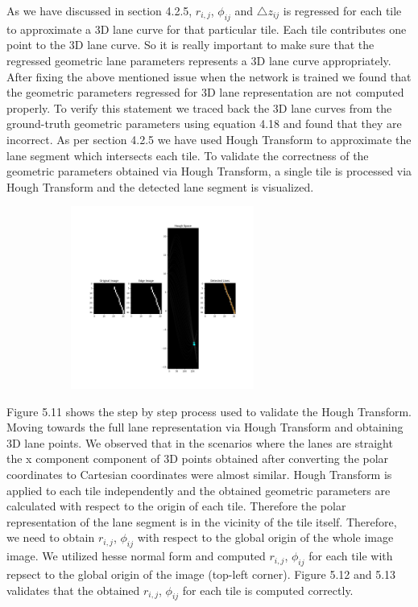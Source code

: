 As we have discussed in section 4.2.5, $r_{i,j}$, $\phi_{ij}$ and $\triangle{z}_{ij}$ is regressed for each tile to approximate a 3D lane curve for that particular tile. Each tile contributes one point to the 3D lane curve. So it is really important to make sure that the regressed geometric lane parameters represents a 3D lane curve appropriately. After fixing the above mentioned issue when the network is trained we found that the geometric parameters regressed for 3D lane representation are not computed properly. To verify this statement we traced back the 3D lane curves from the ground-truth geometric parameters using equation 4.18 and found that they are incorrect. As per section 4.2.5 we have used Hough Transform to approximate the lane segment which intersects each tile. To validate the correctness of the geometric parameters obtained via Hough Transform, a single tile is processed via Hough Transform and the detected lane segment is visualized.

        \begin{figure}[h]
       \caption{Validating Hough Transform and visualizing the detected lane segment from a single tile}
        \centering
        \begin{subfigure}{0.6\textwidth}
        \includegraphics[width=1\linewidth, height=6cm]{images/hough_validation.jpg} 
        \label{fig:subim1}
        \end{subfigure}
        \end{figure}

Figure 5.11 shows the step by step process used to validate the Hough Transform. Moving towards the full lane representation via Hough Transform and obtaining 3D lane points. We observed that in the scenarios where the lanes are straight the x component component of 3D points obtained after converting the polar coordinates to Cartesian coordinates were almost similar. Hough Transform is applied to each tile independently and the obtained geometric parameters are calculated with respect to the origin of each tile. Therefore the polar representation of the lane segment is in the vicinity of the tile itself. Therefore, we need to obtain $r_{i,j}$, $\phi_{ij}$ with respect to the global origin of the whole image image. We utilized hesse normal form and computed $r_{i,j}$, $\phi_{ij}$ for each tile with repsect to the global origin of the image (top-left corner). Figure 5.12 and 5.13 validates that the obtained $r_{i,j}$, $\phi_{ij}$ for each tile is computed correctly. 



